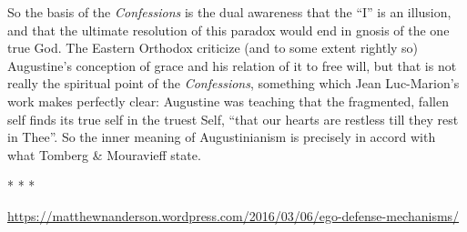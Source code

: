 So the basis of the \emph{Confessions} is the dual awareness that the ``I'' is an illusion, and that the ultimate resolution of this paradox would end in gnosis of the one true God. The Eastern Orthodox criticize (and to some extent rightly so) Augustine's conception of grace and his relation of it to free will, but that is not really the spiritual point of the \emph{Confessions}, something which Jean Luc-Marion's work makes perfectly clear: Augustine was teaching that the fragmented, fallen self finds its true self in the truest Self, ``that our hearts are restless till they rest in Thee''. So the inner meaning of Augustinianism is precisely in accord with what Tomberg \& Mouravieff state.



\begin{center}* * *\end{center}

\begin{footnotesize}
\begin{sffamily}

\url{https://matthewnanderson.wordpress.com/2016/03/06/ego-defense-mechanisms/}
\hfill

\end{sffamily}
\end{footnotesize}

